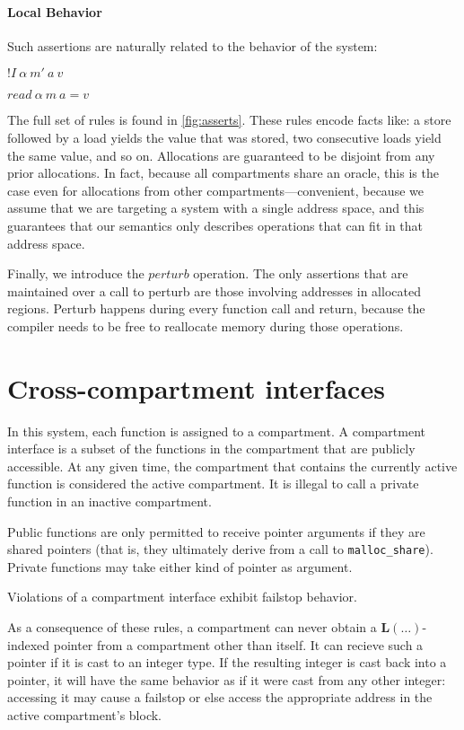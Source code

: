 \documentclass{article}
\begin{document}
\paragraph{Local Behavior}

Such assertions are naturally related to the behavior of the system:

\begin{minipage}[t]{0.25\textwidth}
           {\(! I ~ \alpha ~ m' ~ a ~ v\)}
\end{minipage}
\begin{minipage}[t]{0.25\textwidth}
           {\(\mathit{read} ~ \alpha ~ m ~ a = v\)}
\end{minipage}

The full set of rules is found in \ref{fig:asserts}. These rules encode facts like:
a store followed by a load yields the value that was stored, two consecutive loads yield
the same value, and so on. Allocations are guaranteed to be disjoint from any prior allocations.
In fact, because all compartments share an oracle, this is the case even for allocations from
other compartments---convenient, because we assume that we are targeting a system with a single
address space, and this guarantees that our semantics only describes operations that can fit in
that address space.

Finally, we introduce the \(\mathit{perturb}\) operation. The only assertions that are maintained
over a call to perturb are those involving addresses in allocated regions. Perturb happens during
every function call and return, because the compiler needs to be free to reallocate memory
during those operations.

\section{Cross-compartment interfaces}

In this system, each function is assigned to a compartment. A compartment interface is a subset
of the functions in the compartment that are publicly accessible. At any given time, the compartment
that contains the currently active function is considered the active compartment. It is illegal
to call a private function in an inactive compartment.

Public functions are only permitted to receive pointer arguments if they are shared pointers
(that is, they ultimately derive from a call to {\tt malloc\_share}). Private functions may take
either kind of pointer as argument.

Violations of a compartment interface exhibit failstop behavior.

As a consequence of these rules, a compartment can never obtain a \(\mathbf{L}(\dots)\)-indexed pointer
from a compartment other than itself. It can recieve such a pointer if it is cast to an integer type. If
the resulting integer is cast back into a pointer, it will have the same behavior as if it were cast
from any other integer: accessing it may cause a failstop or else access the appropriate address in
the active compartment's block.
\end{document}
